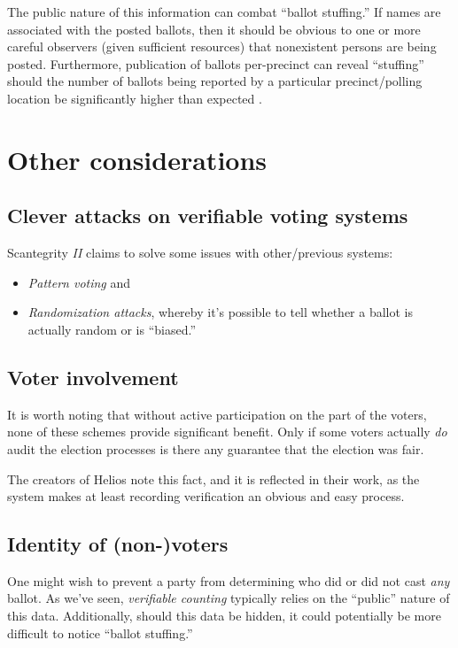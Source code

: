 \documentclass[10pt,twocolumn]{article}
\newcommand{\term}[1]{\textit{#1}}
\begin{document}
The public nature of this information can combat ``ballot stuffing.'' If names are associated with
the posted ballots, then it should be obvious to one or more careful observers (given sufficient
resources) that nonexistent persons are being posted. Furthermore, publication of ballots
per-precinct can reveal ``stuffing'' should the number of ballots being reported by a particular
precinct/polling location be significantly higher than expected \cite{helios}.

\section{Other considerations}

\subsection{Clever attacks on verifiable voting systems}

Scantegrity \emph{II} claims to solve some issues with other/previous systems:
\begin{itemize}
	\item
		\term{Pattern voting} and
	\item
		\term{Randomization attacks}, whereby it's possible to tell whether a ballot is actually random
		or is ``biased.''
\end{itemize}

\subsection{Voter involvement}

It is worth noting that without active participation on the part of the voters, none of these
schemes provide significant benefit. Only if some voters actually \emph{do} audit the election
processes is there any guarantee that the election was fair.

The creators of Helios note this fact, and it is reflected in their work, as the system makes at
least recording verification an obvious and easy process.

\subsection{Identity of (non-)voters}

One might wish to prevent a party from determining who did or did not cast \emph{any} ballot.
As we've seen, \term{verifiable counting} typically relies on the ``public'' nature of this data.
Additionally, should this data be hidden, it could potentially be more difficult to notice ``ballot
stuffing.''
\end{document}
